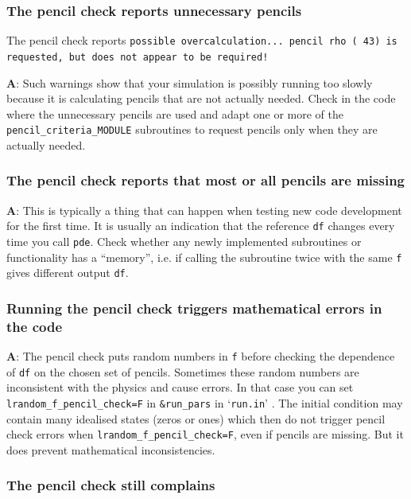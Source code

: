 \documentclass[\mydriver,12pt,twoside,notitlepage,a4paper]{article}
\makeatletter
\newcommand{\code}[1]{\texttt{#1}}
\newcommand{\file}[2][]{%
  \def\index@{#1}%
  `\texttt{#2}'%
  \ifx\index@\@empty\index[file]{#2@\texttt{#2}}%
  \else\index[file]{#1@\texttt{#1}}%
  \fi%
}
\makeatother
\begin{document}
\subsubsection{The pencil check reports unnecessary pencils}

The pencil check reports
\code{possible overcalculation... pencil rho (  43) is requested, but does not
appear to be required!}

\medskip

{\bf A}: Such warnings show that your simulation is possibly running too slowly
because it is calculating pencils that are not actually needed. Check in the
code where the unnecessary pencils are used and adapt one or more of the
\code{pencil_criteria_MODULE} subroutines to request pencils only when they are
actually needed.

\subsubsection{The pencil check reports that most or all pencils are missing}

\medskip

{\bf A}: This is typically a thing that can happen when testing new code
development for the first time. It is usually an indication that the reference
\code{df} changes every time you call \code{pde}. Check whether any newly
implemented subroutines or functionality has a ``memory'', i.e. if calling the
subroutine twice with the same \code{f} gives different output \code{df}.

\subsubsection{Running the pencil check triggers mathematical errors in the code}

{\bf A}: The pencil check puts random numbers in \code{f} before checking the
dependence of \code{df} on the chosen set of pencils. Sometimes these random
numbers are inconsistent with the physics and cause errors. In that case you
can set \code{lrandom_f_pencil_check=F} in \code{\&run_pars} in \file{run.in}.
The initial condition may contain many idealised states (zeros or ones) which
then do not trigger pencil check errors when \code{lrandom_f_pencil_check=F},
even if pencils are missing. But it does prevent mathematical inconsistencies.

\subsubsection{The pencil check still complains}
\end{document}
